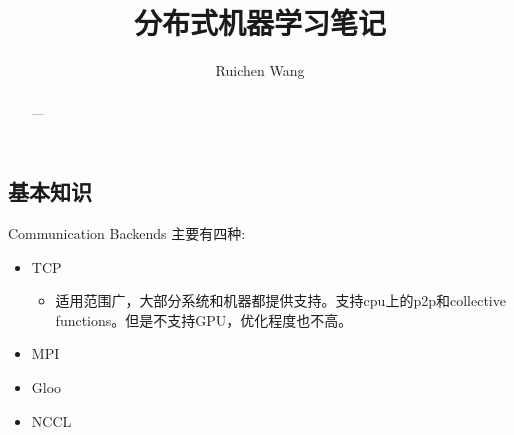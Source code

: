 \documentclass{article}
\title{分布式机器学习笔记}
\author{Ruichen Wang}
\begin{document}
\begin{CJK*}{UTF8}{gbsn}
\maketitle
\begin{abstract}
---
\end{abstract}

\tableofcontents
\section{基本知识}
Communication Backends 主要有四种:
\begin{itemize}
\item TCP 
\begin{itemize}
\item 适用范围广，大部分系统和机器都提供支持。支持cpu上的p2p和collective functions。但是不支持GPU，优化程度也不高。
\end{itemize}
\item MPI
\item Gloo
\item NCCL
\end{itemize}



\end{CJK*}
\end{document}
